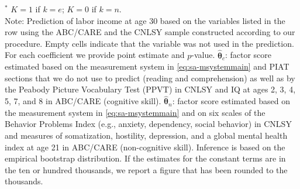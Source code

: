 \documentclass[static]{JJH-Beamer}
\begin{document}
\begin{frame}
\begin{table}[H]
\begin{center}
{}
\end{center}
\tiny \flushleft
$^\ast$ $K=1$ if $k=e$; $K=0$ if $k=n$.\\
Note: Prediction of labor income at age 30 based on the variables listed in the row using the ABC/CARE and the CNLSY sample constructed according to our procedure. Empty cells indicate that the variable was not used in the prediction. For each coefficient we provide point estimate and $p$-value. $\hat{\bm{\theta}}_{c}$: factor score estimated based on the measurement system in \eqref{eq:sa-msystemmain} and PIAT sections that we do not use to predict (reading and comprehension) as well as by the Peabody Picture Vocabulary Test (PPVT) in CNLSY and IQ at ages 2, 3, 4, 5, 7, and 8 in ABC/CARE (cognitive skill). $\hat{\bm{\theta}}_{n}$: factor score estimated based on the measurement system in \eqref{eq:sa-msystemmain} and on six scales of the Behavior Problems Index (e.g., anxiety, dependency, social behavior) in CNLSY and measures of somatization, hostility, depression, and a global mental health index at age 21 in ABC/CARE (non-cognitive skill). Inference is based on the empirical bootstrap distribution. If the estimates for the constant terms are in the ten or hundred thousands, we report a figure that has been rounded to the thousands.\\
\end{table}

\end{frame}
\end{document}
